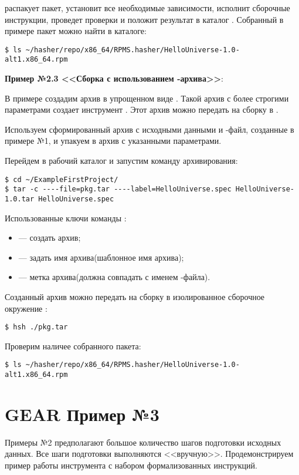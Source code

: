  распакует пакет, установит все необходимые зависимости, исполнит
сборочные инструкции, проведет проверки и положит результат в каталог
. Собранный в примере пакет можно найти в каталоге:
\begin{verbatim}
$ ls ~/hasher/repo/x86_64/RPMS.hasher/HelloUniverse-1.0-alt1.x86_64.rpm
\end{verbatim}

\textbf{Пример №2.3 <<Сборка с использованием -архива>>}:

В примере создадим архив  в упрощенном виде . Такой архив с более строгими
параметрами создает инструмент . Этот архив можно передать на сборку в
.

Используем сформированный архив с исходными данными и -файл, созданные
в примере №1, и  упакуем в архив с указанными параметрами.

Перейдем в рабочий каталог и запустим команду архивирования:
\begin{verbatim}
$ cd ~/ExampleFirstProject/
$ tar -c ----file=pkg.tar ----label=HelloUniverse.spec HelloUniverse-1.0.tar HelloUniverse.spec
\end{verbatim}
Использованные ключи команды :
\begin{itemize}
	\item {} --- создать архив;
	\item {} --- задать имя архива(шаблонное имя архива);
	\item {} --- метка архива(должна совпадать с именем -файла).
\end{itemize}

Созданный архив можно передать на сборку в изолированное сборочное
окружение :
\begin{verbatim}
$ hsh ./pkg.tar
\end{verbatim}

Проверим наличее собранного пакета:
\begin{verbatim}
$ ls ~/hasher/repo/x86_64/RPMS.hasher/HelloUniverse-1.0-alt1.x86_64.rpm
\end{verbatim}

\section{GEAR \textbf{Пример №3}}

Примеры №2 предполагают большое количество шагов подготовки исходных данных.
Все шаги подготовки выполняются <<вручную>>. Продемонстрируем пример работы
инструмента  с набором формализованных инструкций.

